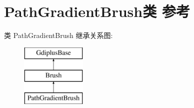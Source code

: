 \hypertarget{class_path_gradient_brush}{}\section{Path\+Gradient\+Brush类 参考}
\label{class_path_gradient_brush}
类 Path\+Gradient\+Brush 继承关系图\+:\begin{figure}[H]
\begin{center}
\leavevmode
\includegraphics[height=3.000000cm]{class_path_gradient_brush}
\end{center}
\end{figure}
